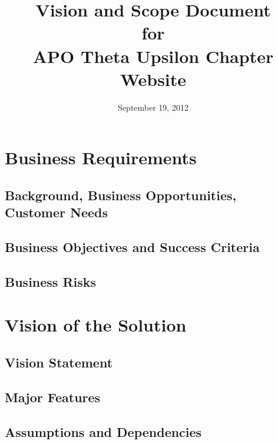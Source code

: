 \documentclass[11pt,letterpaper,rotate]{article}
\title{Vision and Scope Document \\
for \\
APO Theta Upsilon Chapter Website}
\date{September 19, 2012}
\begin{document}
\maketitle
\newpage

\tableofcontents
\listoffigures

\newpage

\section{Business Requirements}


\subsection{Background, Business Opportunities, Customer Needs}


\subsection{Business Objectives and Success Criteria}


\subsection{Business Risks}


\section{Vision of the Solution}


\subsection{Vision Statement}


\subsection{Major Features}


\subsection{Assumptions and Dependencies}
\end{document}
